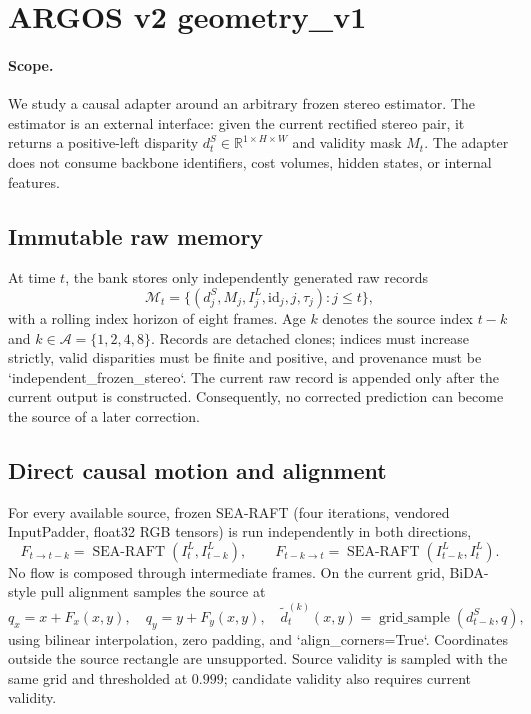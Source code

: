 \section{ARGOS v2 geometry\_v1}
\label{sec:argos-method}
\paragraph{Scope.} We study a causal adapter around an arbitrary frozen stereo estimator. The estimator is an external interface: given the current rectified stereo pair, it returns a positive-left disparity $d_t^S\in\mathbb R^{1\times H\times W}$ and validity mask $M_t$. The adapter does not consume backbone identifiers, cost volumes, hidden states, or internal features.

\subsection{Immutable raw memory}
At time $t$, the bank stores only independently generated raw records
\[
\mathcal M_t=\{(d_j^S,M_j,I_j^L,\mathrm{id}_j,j,\tau_j):j\le t\},
\]
with a rolling index horizon of eight frames. Age $k$ denotes the source index $t-k$ and $k\in\mathcal A=\{1,2,4,8\}$. Records are detached clones; indices must increase strictly, valid disparities must be finite and positive, and provenance must be `independent\_frozen\_stereo`. The current raw record is appended only after the current output is constructed. Consequently, no corrected prediction can become the source of a later correction.

\subsection{Direct causal motion and alignment}
For every available source, frozen SEA-RAFT (four iterations, vendored InputPadder, float32 RGB tensors) is run independently in both directions,
\[
F_{t\rightarrow t-k}=\operatorname{SEA\text{-}RAFT}(I_t^L,I_{t-k}^L),\qquad
F_{t-k\rightarrow t}=\operatorname{SEA\text{-}RAFT}(I_{t-k}^L,I_t^L).
\]
No flow is composed through intermediate frames. On the current grid, BiDA-style pull alignment samples the source at
\[
q_x=x+F_x(x,y),\quad q_y=y+F_y(x,y),\quad
\widetilde d_t^{(k)}(x,y)=\operatorname{grid\_sample}(d_{t-k}^S,q),
\]
using bilinear interpolation, zero padding, and `align\_corners=True`. Coordinates outside the source rectangle are unsupported. Source validity is sampled with the same grid and thresholded at $0.999$; candidate validity also requires current validity.

